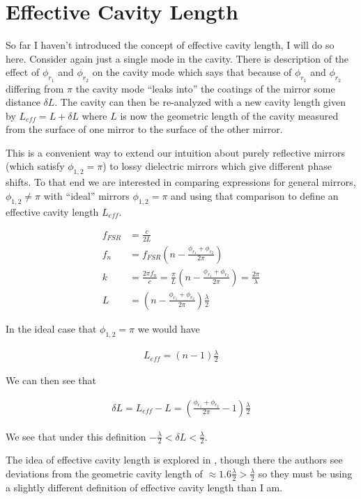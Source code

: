 \documentclass[12pt]{article}
\begin{document}
\section{Effective Cavity Length}

So far I haven't introduced the concept of effective cavity length, I will do so here. Consider again just a single mode in the cavity. There is description of the effect of $\phi_{r_1}$ and $\phi_{r_2}$ on the cavity mode which says that because of $\phi_{r_1}$ and $\phi_{r_2}$ differing from $\pi$ the cavity mode ``leaks into'' the coatings of the mirror some distance $\delta L$. The cavity can then be re-analyzed with a new cavity length given by $L_{eff} = L+\delta L$ where $L$ is now the geometric length of the cavity measured from the surface of one mirror to the surface of the other mirror.

This is a convenient way to extend our intuition about purely reflective mirrors (which satisfy $\phi_{1,2} = \pi$) to lossy dielectric mirrors which give different phase shifts. To that end we are interested in comparing expressions for general mirrors, $\phi_{1,2} \neq \pi$ with ``ideal'' mirrors $\phi_{1,2} = \pi$ and using that comparison to define an effective cavity length $L_{eff}$.

\begin{align}
f_{FSR} &= \frac{c}{2L}\\
f_n &= f_{FSR}\left(n - \frac{\phi_{r_1}+\phi_{r_2}}{2\pi} \right)\\
k &= \frac{2\pi f_n}{c} = \frac{\pi}{L}\left(n-\frac{\phi_{r_1}+\phi_{r_2}}{2\pi}\right) = \frac{2\pi}{\lambda}\\
L &= \left(n-\frac{\phi_{r_1}+\phi_{r_2}}{2\pi}\right)\frac{\lambda}{2}
\end{align}

In the ideal case that $\phi_{1,2} = \pi$ we would have

\begin{align}
L_{eff} = (n-1) \frac{\lambda}{2}
\end{align}

We can then see that

\begin{align}
\delta L = L_{eff}-L = \left(\frac{\phi_{r_1}+\phi_{r_2}}{2\pi} - 1 \right)\frac{\lambda}{2}
\end{align}

We see that under this definition $-\frac{\lambda}{2}<\delta L<\frac{\lambda}{2}$.

The idea of effective cavity length is explored in \cite{Hood2000,Hood2001}, though there the authors see deviations from the geometric cavity length of $\approx 1.6 \frac{\lambda}{2}>\frac{\lambda}{2}$ so they must be using a slightly different definition of effective cavity length than I am.
\end{document}
